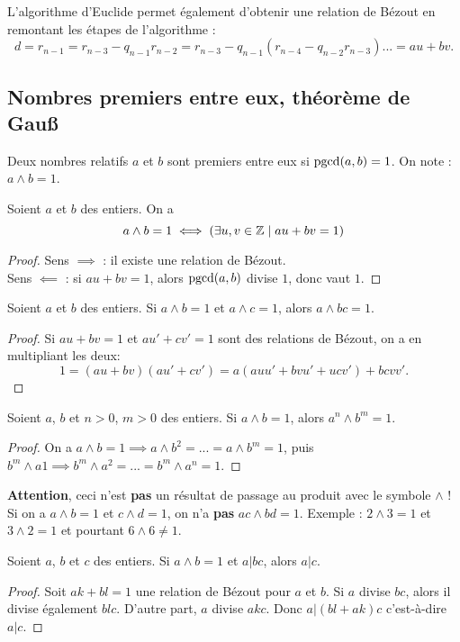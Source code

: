 L'algorithme d'Euclide permet également d'obtenir une relation de Bézout en \og remontant \fg{} les étapes de l'algorithme : 
\[ d = r_{n-1} = r_{n-3} - q_{n-1}r_{n-2} = r_{n-3} - q_{n-1}(r_{n-4} - q_{n-2}r_{n-3})... = au+bv.\]

\subsection{Nombres premiers entre eux, théorème de Gau{\ss}}

\begin{definition}
Deux nombres relatifs $a$ et $b$ sont premiers entre eux si $\operatorname{pgcd}(a,b)=1$. On note :  $a\wedge b = 1$.
\end{definition}

\begin{proposition} Soient $a$ et $b$ des entiers. On a 
\[
a\wedge b = 1 \iff \left(\exists u, v\in \mathbb{Z}\mid au+bv=1\right)
\]
\end{proposition}
\begin{proof}
Sens $\implies$ : il existe une relation de Bézout.\\
Sens $\impliedby$ : si $au+bv=1$, alors  $\operatorname{pgcd}(a,b)$ divise $1$, donc vaut $1$.
\end{proof}

\begin{proposition}
Soient $a$ et $b$ des entiers.
Si $a\wedge b = 1$ et $a\wedge c = 1$, alors $a\wedge bc=1$.
\end{proposition}
\begin{proof}
Si $au+bv=1$ et $au'+cv'=1$ sont des relations de Bézout, on a en multipliant les deux:
\[ 1 = (au+bv)(au'+cv') = a(auu'+bvu'+ucv')+bcvv'.\]
\end{proof}
\begin{corollaire}
Soient $a$, $b$ et $n>0$, $m>0$ des entiers.
Si $a\wedge b = 1$, alors $a^n\wedge b^m=1$.
\end{corollaire}
\begin{proof}
On a $a\wedge b = 1 \implies a\wedge b^2= ... =  a\wedge b^m=1$, puis $b^m\wedge a  1\implies b^m\wedge a^2 = ... = b^m\wedge a^n=1$.
\end{proof}

\textbf{Attention}, ceci n'est \textbf{pas} un résultat de passage au produit avec le symbole $\wedge$ ! Si on a $a\wedge b = 1$ et $c\wedge d = 1$, on n'a \textbf{pas} $ac\wedge bd=1$. Exemple  : $2\wedge 3=1$ et $3\wedge 2=1$ et pourtant $6\wedge 6\neq 1$.

\begin{theoreme}
Soient $a$, $b$ et $c$ des entiers.
Si $a\wedge b = 1$ et $a|bc$, alors $a|c$.
\end{theoreme}
\begin{proof}
Soit $ak+bl=1$ une relation de Bézout pour $a$ et $b$.
Si $a$ divise $bc$, alors il divise également $blc$. D'autre part, $a$ divise $akc$. Donc $a | (bl+ak)c$ c'est-à-dire $a|c$.
\end{proof}

